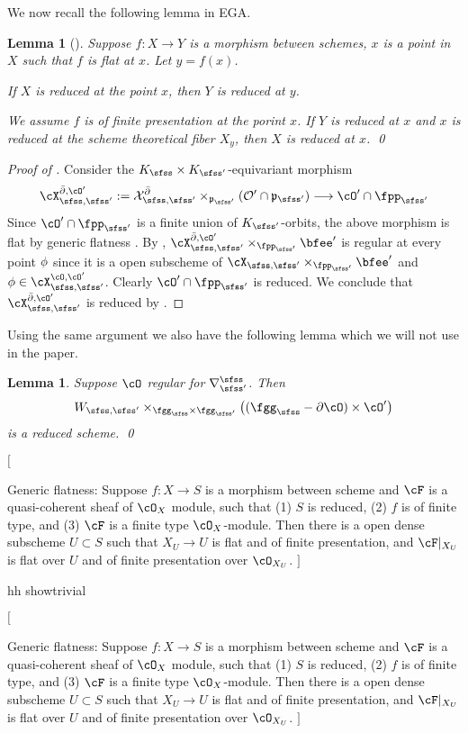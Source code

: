 \documentclass[12pt,a4paper]{amsart}
\newcommand{\trivial}[2][]{\if\relax\detokenize{#1}\relax
  {%
      \color{orange} \vspace{0em} $[$  #2 $]$
      \color{black}
  }
  \else
\ifx#1h
\ifcsname showtrivial\endcsname
{%
    \color{orange} \vspace{0em}  $[$ #2 $]$
    \color{black}
}
\fi
\else {\red Wrong argument!} \fi
\fi
}
\newcommand{\CO}{{\mathcal {O}}}
\newcommand{\CX}{{\mathcal {X}}}
\newcommand{\p}{\mathfrak p}
\numberwithin{equation}{section}
\newtheorem{lem}[thm]{Lemma}
\theoremstyle{remark}
\def\UU{\rU}
\def\bcOp{\overline{\cO'}}
\def\cOp{\cO^{\prime}}
\begin{document}
We now recall the following lemma in EGA.
\begin{lem}[{\cite[Proposition~11.3.13]{EGAIV3}}] \label{lem:red}
  Suppose $f\colon X\rightarrow Y$ is a morphism between schemes, $x$ is a point
  in $X$ such that $f$ is flat at $x$. Let $y=f(x)$.
  \begin{enuma}
    \item  If $X$ is reduced at the point $x$, then $Y$ is reduced at $y$.
    \item We assume $f$ is of finite presentation at the porint $x$.
    If $Y$ is reduced at $x$ and $x$ is reduced at the scheme theoretical fiber
    $X_{y}$, then $X$ is reduced at $x$. \qed
  \end{enuma}
\end{lem}

\begin{proof}[Proof of ]
  Consider the $\Ks\times \Ksp$-equivariant morphism
  \[
    \CXUO:=\CX_{\sfss, \sfss'}^{\bar \partial}\times_{\p_{\sfss'}} ({\CO'}\cap \p_{\sfss'}) \longrightarrow  \cO'\cap \fppsp
  \]
  Since $\cO'\cap \fppsp$
  is a finite union of $\Ksp$-orbits, the above morphism is flat  by generic
  flatness \cite[Th\'eor\`eme~6.9.1]{EGAIV2}.
  By , $\CXUO \times_{\fppsp} \Xp$ is regular at every point $\phi$ since
  it is a open subscheme of $\CXss\times_{\fppsp}\Xp $ and $\ww\in \CXOO$.
  Clearly $\cOp\cap \fppsp$ is reduced. We conclude that $\CXUO$ is reduced by .
\end{proof}


Using the same argument we also have the following lemma which we will not use in the
paper.
\begin{lem}\label{lem:RDS.C}
  Suppose $\cO$ regular for $\DDss$.
  Then
  \[
    \Wss\times_{\fggs\times \fggsp} \big( (\fggs - \partial \cO)\times \cOp\big)
  \]
  is a reduced scheme. \qed
\end{lem}



\trivial[h]{

  Generic flatness: Suppose $f: X\rightarrow S $ is a morphism between scheme
  and $\cF$ is a quasi-coherent sheaf of $\cO_{X}$ module, such that (1) $S$ is
  reduced, (2) $f$ is of finite type, and (3) $\cF$ is a finite type
  $\cO_{X}$-module.
Then there is a open dense subscheme $U\subset S$ such that
$X_{U}\rightarrow U $
is flat and of finite presentation, and $\cF|_{X_U}$ is flat over $U$
and of finite presentation over $\cO_{X_{U}}$.
}
\end{document}
